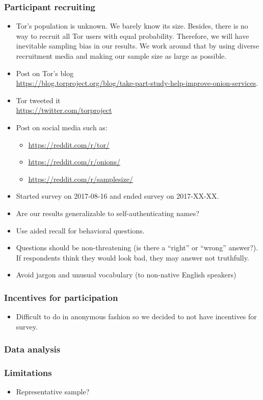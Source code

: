 \subsubsection{Participant recruiting}
\begin{itemize}
    \item Tor's population is unknown.  We barely know its size.  Besides, there
        is no way to recruit all Tor users with equal probability.  Therefore,
        we will have inevitable sampling bias in our results.  We work around
        that by using diverse recruitment media and making our sample size as
        large as possible.
    \item Post on Tor's blog\\\url{https://blog.torproject.org/blog/take-part-study-help-improve-onion-services}.
    \item Tor tweeted it\\\url{https://twitter.com/torproject}
    \item Post on social media such as:
        \begin{itemize}
            \item \url{https://reddit.com/r/tor/}
            \item \url{https://reddit.com/r/onions/}
            \item \url{https://reddit.com/r/samplesize/}
        \end{itemize}
    \item Started survey on 2017-08-16 and ended survey on 2017-XX-XX.
\end{itemize}

\begin{itemize}
    \item Are our results generalizable to self-authenticating names?
    \item Use aided recall for behavioral questions.
    \item Questions should be non-threatening (is there a ``right'' or ``wrong''
        answer?).  If respondents think they would
        look bad, they may answer not truthfully.
    \item Avoid jargon and unusual vocabulary (to non-native English speakers)
\end{itemize}

\subsubsection{Incentives for participation}
\begin{itemize}
    \item Difficult to do in anonymous fashion so we decided to not have
        incentives for survey.
\end{itemize}

\subsubsection{Data analysis}

\subsubsection{Limitations}
\begin{itemize}
    \item Representative sample?
\end{itemize}
